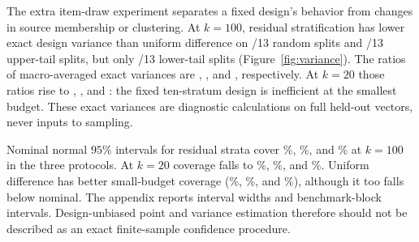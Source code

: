 The extra item-draw experiment separates a fixed design's behavior from changes in source membership or clustering. At $k=100$, residual stratification has lower exact design variance than uniform difference on \RandomLargeVarianceWins/13 random splits and \UpperLargeVarianceWins/13 upper-tail splits, but only \LowerLargeVarianceWins/13 lower-tail splits (Figure~\ref{fig:variance}). The ratios of macro-averaged exact variances are \RandomLargeVarianceRatio, \UpperLargeVarianceRatio, and \LowerLargeVarianceRatio, respectively. At $k=20$ those ratios rise to \RandomSmallVarianceRatio, \UpperSmallVarianceRatio, and \LowerSmallVarianceRatio: the fixed ten-stratum design is inefficient at the smallest budget. These exact variances are diagnostic calculations on full held-out vectors, never inputs to sampling.

Nominal normal $95$\% intervals for residual strata cover \RandomResidualStrataLargeCoverage\%, \UpperResidualStrataLargeCoverage\%, and \LowerResidualStrataLargeCoverage\% at $k=100$ in the three protocols. At $k=20$ coverage falls to \RandomResidualStrataSmallCoverage\%, \UpperResidualStrataSmallCoverage\%, and \LowerResidualStrataSmallCoverage\%. Uniform difference has better small-budget coverage (\RandomDifferenceSmallCoverage\%, \UpperDifferenceSmallCoverage\%, and \LowerDifferenceSmallCoverage\%), although it too falls below nominal. The appendix reports interval widths and benchmark-block intervals. Design-unbiased point and variance estimation therefore should not be described as an exact finite-sample confidence procedure.
